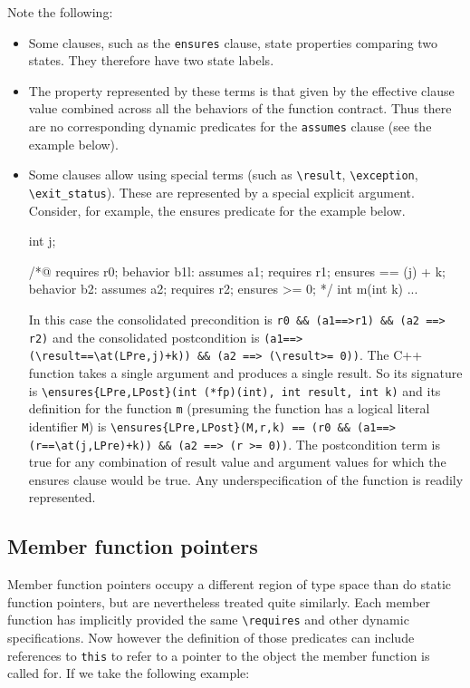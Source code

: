 Note the following:
\begin{itemize}
	\item Some clauses, such as the \lstinline|ensures| clause,
	state properties comparing two states. They therefore have two state labels.
	\item The property represented by these terms is that
	given by the effective clause value combined across all the
	behaviors of the function contract. Thus there are no
	corresponding dynamic predicates for the \lstinline|assumes| clause (see the example below).
	\item Some clauses allow using special terms (such as 
	\lstinline|\result|, 
	\lstinline|\exception|, \lstinline|\exit_status|). 
	These are represented by a special explicit argument. Consider, for example, the ensures predicate for the example below.

\begin{listing-nonumber}
int j;
		
/*@
requires r0;
behavior b1l:
  assumes a1;
  requires r1;
  ensures \result == \old(j) + k;
behavior b2:
  assumes a2;
  requires r2;
  ensures \result >= 0;
*/
int m(int k) { ... }
\end{listing-nonumber}

	In this case the consolidated precondition is
	\lstinline|r0 && (a1==>r1) && (a2 ==> r2)|
	and the consolidated postcondition is 
	\lstinline|(a1==>(\result==\at(LPre,j)+k)) && (a2 ==> (\result>= 0))|.
	The C++ function takes a single argument and produces a single result. So its signature is
	\lstinline|\ensures{LPre,LPost}(int (*fp)(int), int result, int k)|	
	and its definition for the function \lstinline|m| (presuming the function has a logical literal identifier \lstinline|M|) is
	\lstinline|\ensures{LPre,LPost}(M,r,k) == (r0 && (a1==>(r==\at(j,LPre)+k)) && (a2 ==> (r >= 0))|.
	The postcondition term is true for any combination of 
	result value and argument values for which the ensures clause would be true. Any underspecification of the function is readily represented.

\end{itemize}

\subsection{Member function pointers}
\label{sec:memberfp}
Member function pointers occupy a different region of type space than
do static function pointers, but are nevertheless treated quite
similarly. Each member function has implicitly provided the same
\lstinline|\requires| and other dynamic specifications. Now however
the definition of those predicates can include references to
\lstinline|this| to refer to a pointer to the object the member
function is called for. If we take the following example:

